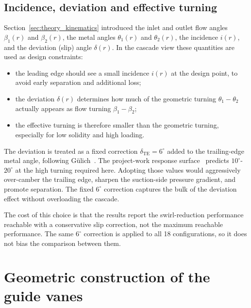 \subsection{Incidence, deviation and effective turning}
\label{sec:theory_incidence_deviation}
 
Section~\ref{sec:theory_kinematics} introduced the inlet and outlet flow angles $\beta_1(r)$ and $\beta_2(r)$, the metal angles $\theta_1(r)$ and $\theta_2(r)$, the incidence $i(r)$, and the deviation (slip) angle $\delta(r)$. In the cascade view these quantities are used as design constraints:
\begin{itemize}
  \item the leading edge should see a small incidence $i(r)$ at the design point, to avoid early separation and additional loss;
  \item the deviation $\delta(r)$ determines how much of the geometric turning $\theta_1 - \theta_2$ actually appears as flow turning $\beta_1 - \beta_2$;
  \item the effective turning is therefore smaller than the geometric turning, especially for low solidity and high loading.
\end{itemize}
The deviation is treated as a fixed correction $\delta_{\mathrm{TE}} = 6^\circ$ added to the trailing-edge metal angle, following G\"ulich~\cite{Gulich2010}. The project-work response surface~\cite{Leonsen2025} predicts $10^\circ$-$20^\circ$ at the high turning required here. Adopting those values would aggressively over-camber the trailing edge, sharpen the suction-side pressure gradient, and promote separation. The fixed $6^\circ$ correction captures the bulk of the deviation effect without overloading the cascade.

The cost of this choice is that the results report the swirl-reduction performance reachable with a conservative slip correction, not the maximum reachable performance. The same $6^\circ$ correction is applied to all 18 configurations, so it does not bias the comparison between them.
 
\section{Geometric construction of the guide vanes}
\label{sec:theory_geometric_construction}
 
